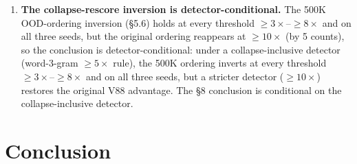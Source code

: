 \documentclass[11pt]{article}
\begin{document}
\begin{enumerate}
  \item \textbf{The collapse-rescore inversion is detector-conditional.} The 500K OOD-ordering inversion (\S5.6) holds at every threshold $\geq 3\times$--$\geq 8\times$ and on all three seeds, but the original ordering reappears at $\geq 10\times$ (by 5 counts), so the conclusion is detector-conditional: under a collapse-inclusive detector (word-3-gram $\geq 5\times$ rule), the 500K ordering inverts at every threshold $\geq 3\times$--$\geq 8\times$ and on all three seeds, but a stricter detector ($\geq 10\times$) restores the original V88 advantage. The \S8 conclusion is conditional on the collapse-inclusive detector.
\end{enumerate}

\section{Conclusion}
\end{document}
